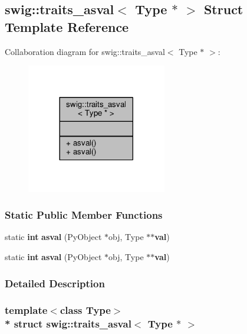 \subsection{swig\+:\+:traits\+\_\+asval$<$ Type $\ast$ $>$ Struct Template Reference}
\label{structswig_1_1traits__asval_3_01Type_01_5_01_4}


Collaboration diagram for swig\+:\+:traits\+\_\+asval$<$ Type $\ast$ $>$\+:
\nopagebreak
\begin{figure}[H]
\begin{center}
\leavevmode
\includegraphics[width=173pt]{d4/d60/structswig_1_1traits__asval_3_01Type_01_5_01_4__coll__graph}
\end{center}
\end{figure}
\subsubsection*{Static Public Member Functions}
\begin{DoxyCompactItemize}
\item 
static {\bf int} {\bf asval} (Py\+Object $\ast$obj, Type $\ast$$\ast${\bf val})
\item 
static {\bf int} {\bf asval} (Py\+Object $\ast$obj, Type $\ast$$\ast${\bf val})
\end{DoxyCompactItemize}


\subsubsection{Detailed Description}
\subsubsection*{template$<$class Type$>$\\*
struct swig\+::traits\+\_\+asval$<$ Type $\ast$ $>$}



